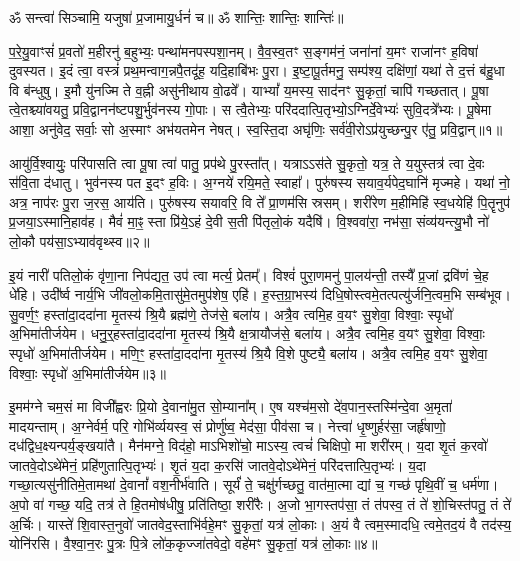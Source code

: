 \setcounter{anuvakam}{0}
ॐ सन्त्वा॑ सिञ्चामि॒ यजुषा॑ प्र॒जामायु॒र्धनं॑ च॥ ॐ शान्तिः॒ शान्तिः॒ शान्तिः॑॥

प॒रे॒यु॒वाꣳसं॑ प्र॒वतो॑ म॒हीरनु॑ ब॒हुभ्यः॒ पन्था॑मनपस्पशा॒नम्। 
वै॒व॒स्व॒तꣳ स॒ङ्गम॑नं॒ जना॑नां य॒मꣳ राजा॑नꣳ ह॒विषा॑ दुवस्यत। 
इ॒दं त्वा॒ वस्त्रं॑ प्रथ॒मन्वाग॒न्नपै॒तदू॑ह॒ यदि॒हाबि॑भः पु॒रा। 
इ॒ष्टा॒पू॒र्तमनु॒ सम्प॑श्य॒ दक्षि॑णां॒ यथा॑ ते द॒त्तं ब॑हु॒धा वि ब॑न्धुषु। 
इ॒मौ यु॑नज्मि ते व॒ह्नी असु॑नीथाय वो॒ढवे᳚। 
याभ्यां᳚ य॒मस्य॒ साद॑नꣳ सु॒कृतां॒ चापि॑ गच्छतात्। 
पू॒षा त्वे॒तश्च्या॑वयतु॒ प्रवि॒द्वानन॑ष्टपशु॒र्भुव॑नस्य गो॒पाः। 
स त्वै॒तेभ्यः॒ परि॑ददात्पि॒तृभ्यो॒ऽग्निर्दे॒वेभ्यः॑ सुवि॒दत्रे᳚भ्यः। 
पू॒षेमा आशा॒ अनु॑वेद॒ सर्वाः॒ सो अ॒स्माꣳ अभ॑यतमेन नेषत्। 
स्व॒स्ति॒दा अघृ॑णिः॒ सर्व॑वी॒रोऽप्र॑युच्छन्पु॒र ए॑तु॒ प्रवि॒द्वान्॥१॥

आयु॑र्वि॒श्वायुः॒ परि॑पासति त्वा पू॒षा त्वा॑ पातु॒ प्रप॑थे पु॒रस्ता᳚त्। 
यत्राऽऽस॑ते सु॒कृतो॒ यत्र॒ ते य॒युस्तत्र॑ त्वा दे॒वः स॑वि॒ता द॑धातु। 
भुव॑नस्य पत इ॒दꣳ ह॒विः। 
अ॒ग्नये॑ रयि॒मते॒ स्वाहा᳚। 
पुरु॑षस्य सयाव॒र्यपेद॒घानि॑ मृज्महे। 
यथा॑ नो॒ अत्र॒ नाप॑रः पु॒रा ज॒रस॒ आय॑ति। 
पुरु॑षस्य सयावरि॒ वि ते᳚ प्रा॒णम॑सि स्रसम्। 
शरी॑रेण म॒हीमिहि॑ स्व॒धयेहि॑ पि॒तॄनुप॑ प्र॒जया॒ऽस्मानि॒हाव॑ह। 
मैवं॑ मा॒ꣴ॒ स्ता प्रि॑ये॒ऽहं दे॒वी स॒ती पि॑तृलो॒कं यदैषि॑। 
वि॒श्ववा॑रा॒ नभ॑सा॒ संव्य॑यन्त्यु॒भौ नो॑ लो॒कौ पय॑सा॒ऽभ्याव॑वृथ्स्व॥२॥

इ॒यं नारी॑ पतिलो॒कं वृ॑णा॒ना निप॑द्यत॒ उप॑ त्वा मर्त्य॒ प्रेतम्᳚। 
विश्वं॑ पुरा॒णमनु॑ पा॒लय॑न्ती॒ तस्यै᳚ प्र॒जां द्रवि॑णं चे॒ह धे॑हि। 
उदी᳚र्ष्व नार्य॒भि जी॑वलो॒कमि॒तासु॑मे॒तमुप॑शेष॒ एहि॑। 
ह॒स्त॒ग्रा॒भस्य॑ दिधि॒षोस्त्वमे॒तत्पत्यु॑र्जनि॒त्वम॒भि सम्ब॑भूव। 
सु॒वर्ण॒ꣳ॒ हस्ता॑दा॒ददा॑ना मृ॒तस्य॑ श्रि॒यै ब्रह्म॑णे॒ तेज॑से॒ बला॑य। 
अत्रै॒व त्वमि॒ह व॒यꣳ सु॒शेवा॒ विश्वाः॒ स्पृधो॑ अ॒भिमा॑तीर्जयेम। 
धनु॒र्॒\mbox{}हस्ता॑दा॒ददा॑ना मृ॒तस्य॑ श्रि॒यै क्ष॒त्रायौज॑से॒ बला॑य। 
अत्रै॒व त्वमि॒ह व॒यꣳ सु॒शेवा॒ विश्वाः॒ स्पृधो॑ अ॒भिमा॑तीर्जयेम। 
मणि॒ꣳ॒ हस्ता॑दा॒ददा॑ना मृ॒तस्य॑ श्रि॒यै वि॒शे पुष्ट्यै॒ बला॑य। 
अत्रै॒व त्वमि॒ह व॒यꣳ सु॒शेवा॒ विश्वाः॒ स्पृधो॑ अ॒भिमा॑तीर्जयेम॥३॥

इ॒मम॑ग्ने चम॒सं मा विजी᳚ह्वरः प्रि॒यो दे॒वाना॑मु॒त सो॒म्याना᳚म्। 
ए॒ष यश्च॑म॒सो दे॑व॒पान॒स्तस्मि॑न्दे॒वा अ॒मृता॑ मादयन्ताम्। 
अ॒ग्नेर्वर्म॒ परि॒ गोभि॑र्व्ययस्व॒ सं प्रोर्णु॑ष्व॒ मेद॑सा॒ पीव॑सा च। 
नेत्त्वा॑ धृ॒ष्णुर्\mbox{}हर॑सा॒ जर्\mbox{}हृ॑षाणो॒ दध॑द्विध॒क्ष्यन्पर्य॒ङ्खया॑तै। 
मैन॑मग्ने॒ विद॑हो॒ माऽभिशो॑चो॒ माऽस्य॒ त्वचं॑ चिक्षिपो॒ मा शरी॑रम्। 
य॒दा शृ॒तं क॒रवो॑ जातवे॒दोऽथे॑मेनं॒ प्रहि॑णुतात्पि॒तृभ्यः॑। 
शृ॒तं य॒दा क॒रसि॑ जातवे॒दोऽथे॑मेनं॒ परि॑दत्तात्पि॒तृभ्यः॑। 
य॒दा गच्छा॒त्यसु॑नीतिमे॒तामथा॑ दे॒वानां᳚ वश॒नीर्भ॑वाति। 
सूर्यं॑ ते॒ चक्षु॑र्गच्छतु॒ वात॑मा॒त्मा द्यां च॒ गच्छ॑ पृथि॒वीं च॒ धर्म॑णा। 
अ॒पो वा॑ गच्छ॒ यदि॒ तत्र॑ ते हि॒तमोष॑धीषु॒ प्रति॑तिष्ठा॒ शरी॑रैः। 
अ॒जो भा॒गस्तप॑सा॒ तं त॑पस्व॒ तं ते॑ शो॒चिस्त॑पतु॒ तं ते॑ अ॒र्चिः। 
यास्ते॑ शि॒वास्त॒नुवो॑ जातवेद॒स्ताभि॑र्वहे॒मꣳ सु॒कृतां॒ यत्र॑ लो॒काः। 
अ॒यं वै त्वम॒स्मादधि॒ त्वमे॒तद॒यं वै तद॑स्य॒ योनि॑रसि। 
वै॒श्वा॒न॒रः पु॒त्रः पि॒त्रे लो॑क॒कृज्जा॑तवेदो॒ वहे॑मꣳ सु॒कृतां॒ यत्र॑ लो॒काः॥४॥
\anuvakamend[वि॒द्वान॒भ्याव॑वृथ्स्वा॒भिमा॑तीर्जयेम॒ शरी॑रैश्च॒त्वारि॑ च]

